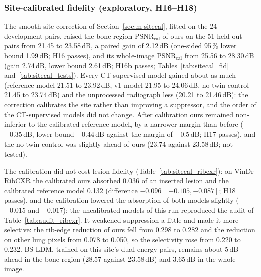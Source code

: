 \subsubsection{Site-calibrated fidelity (exploratory, H16--H18)}
\label{sec:res-sitecal}
The smooth site correction of Section~\ref{sec:m-sitecal}, fitted on the 24 development pairs, raised the bone-region PSNR$_{\mathrm{cal}}$
of ours on the 51 held-out pairs from 21.45 to 23.58\,dB, a paired gain of 2.12\,dB (one-sided 95\,\% lower bound 1.99\,dB; H16 passes),
and its whole-image PSNR$_{\mathrm{cal}}$ from 25.56 to 28.30\,dB (gain 2.74\,dB, lower bound 2.61\,dB; H16b passes;
Tables~\ref{tab:sitecal_fid} and~\ref{tab:sitecal_tests}). Every CT-supervised model gained about as much (reference model 21.51 to
23.92\,dB, v1 model 21.95 to 24.06\,dB, no-twin control 21.45 to 23.74\,dB) and the unprocessed radiograph less (20.21 to 21.46\,dB): the
correction calibrates the site rather than improving a suppressor, and the order of the CT-supervised models did not change. After
calibration ours remained non-inferior to the calibrated reference model, by a narrower margin than before ($-0.35$\,dB, lower bound
$-0.44$\,dB against the margin of $-0.5$\,dB; H17 passes), and the no-twin control was slightly ahead of ours (23.74 against 23.58\,dB; not
tested).

The calibration did not cost lesion fidelity (Table~\ref{tab:sitecal_ribcxr}): on VinDr-RibCXR the calibrated ours absorbed 0.036 of an
inserted lesion and the calibrated reference model 0.132 (difference $-0.096$ $[-0.105,-0.087]$; H18 passes), and the calibration lowered
the absorption of both models slightly ($-0.015$ and $-0.017$); the uncalibrated models of this run reproduced the audit of
Table~\ref{tab:audit_ribcxr}. It weakened suppression a little and made it more selective: the rib-edge reduction of ours fell from 0.298 to
0.282 and the reduction on other lung pixels from 0.078 to 0.050, so the selectivity rose from 0.220 to 0.232. BS-LDM, trained on this
site's dual-energy pairs, remains about 5\,dB ahead in the bone region (28.57 against 23.58\,dB) and 3.65\,dB in the whole image.

\begin{table}[!t]
\centering
\caption{Site-calibrated fidelity on the 51 held-out SZCH-X-Rays pairs (exploratory, SAP\_v5): every method as is and with the smooth site
correction of Eq.~\eqref{eq:sitecal} fitted on the 24 development pairs. BS-LDM, trained on this site's dual-energy pairs, is not
corrected.}
\label{tab:sitecal_fid}
\end{table}

